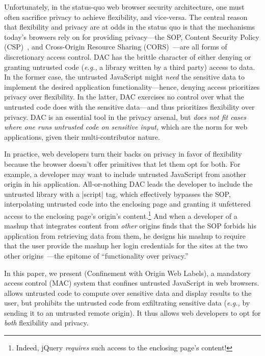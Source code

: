 Unfortunately, in the status-quo web browser security architecture,
one must often sacrifice privacy to achieve flexibility, and
vice-versa. The central reason that flexibility and privacy are at
odds in the status quo is that the mechanisms today's browsers rely on
for providing privacy---the SOP, Content Security Policy
(CSP)~\cite{csp}, and Cross-Origin Resource Sharing
(CORS)~\cite{cors13}---are all forms of discretionary access control.
DAC has the brittle character of either denying or granting
untrusted code (\emph{e.g.,} a library written by a third party) access to
data. In the former case, the untrusted JavaScript might {\em need}
the sensitive data to implement the desired application
functionality---hence, denying access prioritizes privacy over
flexibility. In the latter, DAC exercises no control over what the
untrusted code does with the sensitive data---and thus prioritizes
flexibility over privacy. DAC is an essential tool in the privacy
arsenal, but {\em does not fit cases where one runs untrusted code on
  sensitive input,} which are the norm for web applications, given
their multi-contributor nature.

In practice, web developers turn their backs on privacy in favor of
flexibility because the browser doesn't offer primitives that let them
opt for both. For example, a developer may want to include untrusted
JavaScript from another origin in his application. All-or-nothing DAC
leads the developer to include the untrusted library with a
\js|script| tag, which effectively bypasses the SOP, interpolating
untrusted code into the enclosing page and granting it unfettered
access to the enclosing page's origin's content.\footnote{Indeed,
  jQuery \emph{requires} such access to the enclosing page's content!}
And when a developer of a mashup that integrates content from {\em
  other} origins finds that the SOP forbids his application from
retrieving data from them, he designs his mashup to require that the
user provide the mashup her login credentials for the sites at the two
other origins~\cite{mint.com}---the epitome of ``functionality over
privacy.''

In this paper, we present \sys{} (Confinement with Origin Web Labels),
a mandatory access control (MAC) system that confines untrusted
JavaScript in web browsers. \sys{} allows untrusted code to compute
over sensitive data and display results to the user, but prohibits the
untrusted code from exfiltrating sensitive data (\emph{e.g.,} by sending it
to an untrusted remote origin). It thus allows web developers to opt
for {\em both} flexibility and privacy.

